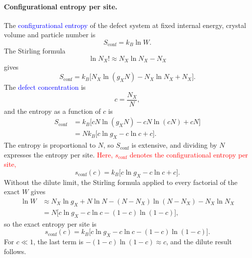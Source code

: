 \paragraph{Configurational entropy per site.}
The \textcolor{blue}{configurational entropy} of the defect system at fixed
internal energy, crystal volume and particle number is
\begin{equation*}
    S_{\text{conf}}=k_B\ln W.
\end{equation*}
The Stirling formula
\begin{equation*}
    \ln N_X!\approx N_X\ln N_X-N_X
\end{equation*}
gives
\begin{equation*}
    S_{\text{conf}}=k_B\big[N_X\ln(g_XN)-N_X\ln N_X+N_X\big].
\end{equation*}
The \textcolor{blue}{defect concentration} is
\begin{equation*}
    c=\frac{N_X}{N},
\end{equation*}
and the entropy as a function of $c$ is
\begin{align*}
    S_{\text{conf}}&=k_B\big[cN\ln(g_XN)-cN\ln(cN)+cN\big]\\
    &=Nk_B\big[c\ln g_X-c\ln c+c\big].
\end{align*}
The entropy is proportional to $N$, so $S_{\text{conf}}$ is extensive, and
dividing by $N$ expresses the entropy per site.
\textcolor{red}{Here, $s_{\text{conf}}$ denotes the configurational entropy
per site,}
\begin{equation}
    \boxed{s_{\text{conf}}(c)=k_B\big[c\ln g_X-c\ln c+c\big].}
\end{equation}
Without the dilute limit, the Stirling formula applied to every factorial of
the exact $W$ gives
\begin{align*}
    \ln W&\approx N_X\ln g_X+N\ln N-(N-N_X)\ln(N-N_X)-N_X\ln N_X\\
    &=N\big[c\ln g_X-c\ln c-(1-c)\ln(1-c)\big],
\end{align*}
so the exact entropy per site is
\begin{equation*}
    s_{\text{conf}}(c)=k_B\big[c\ln g_X-c\ln c-(1-c)\ln(1-c)\big].
\end{equation*}
For $c\ll1$, the last term is $-(1-c)\ln(1-c)\approx c$, and the dilute
result follows.

